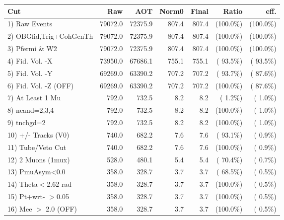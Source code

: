  \begin{table}[h!]\centering
 \begin{tabular}{||l||r|r|r|r|r|r||}
 \hline
 \hline
 Cut & Raw & AOT & Norm0 & Final & Ratio & eff.       \\
 \hline
  1) Raw Events           &      79072.0 &      72375.9 &        807.4 &        807.4 & (100.0\%) & (100.0\%) \\
  2) OBGfid,Trig+CohGenTh &      79072.0 &      72375.9 &        807.4 &        807.4 & (100.0\%) & (100.0\%) \\
  3) Pfermi \& W2         &      79072.0 &      72375.9 &        807.4 &        807.4 & (100.0\%) & (100.0\%) \\
  4) Fid. Vol. -X         &      73950.0 &      67686.1 &        755.1 &        755.1 & ( 93.5\%) & ( 93.5\%) \\
  5) Fid. Vol. -Y         &      69269.0 &      63390.2 &        707.2 &        707.2 & ( 93.7\%) & ( 87.6\%) \\
  6) Fid. Vol. -Z (OFF)   &      69269.0 &      63390.2 &        707.2 &        707.2 & (100.0\%) & ( 87.6\%) \\
  7) At Least 1 Mu        &        792.0 &        732.5 &          8.2 &          8.2 & (  1.2\%) & (  1.0\%) \\
  8) ncand=2,3,4          &        792.0 &        732.5 &          8.2 &          8.2 & (100.0\%) & (  1.0\%) \\
  9) tnchgd=2             &        792.0 &        732.5 &          8.2 &          8.2 & (100.0\%) & (  1.0\%) \\
 10) +/- Tracks (V0)      &        740.0 &        682.2 &          7.6 &          7.6 & ( 93.1\%) & (  0.9\%) \\
 11) Tube/Veto Cut        &        740.0 &        682.2 &          7.6 &          7.6 & (100.0\%) & (  0.9\%) \\
 12) 2 Muons (1mux)       &        528.0 &        480.1 &          5.4 &          5.4 & ( 70.4\%) & (  0.7\%) \\
 13) PmuAsym<0.0          &        358.0 &        328.7 &          3.7 &          3.7 & ( 68.5\%) & (  0.5\%) \\
 14) Theta$<$2.62 rad     &        358.0 &        328.7 &          3.7 &          3.7 & (100.0\%) & (  0.5\%) \\
 15) Pt+wrt- $>$0.05      &        358.0 &        328.7 &          3.7 &          3.7 & (100.0\%) & (  0.5\%) \\
 16) Mee $>$ 2.0  (OFF)   &        358.0 &        328.7 &          3.7 &          3.7 & (100.0\%) & (  0.5\%) \\

\end{tabular}
\end{table}
